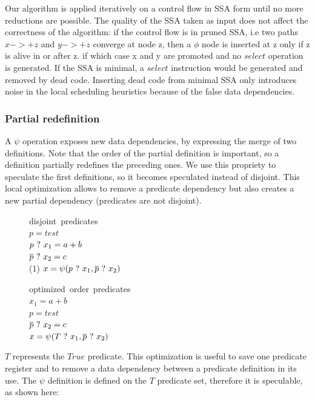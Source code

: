 Our algorithm is applied iteratively on a control flow in SSA form until no more reductions are possible. The quality of the SSA taken as input does not affect the correctness of the algorithm: if the control flow is in pruned SSA, i.e two paths $x->+z$ and $y->+z$ converge at node z, then a $\phi$ node is inserted at z only if z is alive in or after z. if which case x and y are promoted and no $select$ operation is generated. If the SSA is minimal, a $select$ instruction would be generated and removed by dead code. Inserting dead code from minimal SSA only introduces noise in the local scheduling heuristics because of the false data dependencies.

\subsubsection{Partial redefinition}

A $\psi$ operation exposes new data dependencies, by expressing the merge of two definitions. Note that the order of the partial definition is important, so a definition partially redefines the preceding ones. We use this propriety to speculate the first definitions, so it becomes speculated instead of disjoint. This local optimization allows to remove a predicate dependency but also creates a new partial dependency (predicates are not disjoint). 

\begin{figure}
\footnotesize
\begin{minipage}[t]{4cm}
\mbox{disjoint predicates} \\
$ p = test $ \\
$ p ~?~ x_1 = a + b $ \\
$ \overline{p} ~?~ x_2 = c $ \\
(1) $ x = \psi(p ~?~ x_1, \overline{p} ~?~ x_2) $ \\
\end{minipage}
\begin{minipage}[t]{4cm}
\mbox{optimized order predicates} \\
$ x_1 = a + b $ \\
$ p = test $ \\
$ \overline{p} ~?~ x_2 = c $ \\
$ x = \psi(T ~?~ x_1, \overline{p} ~?~ x_2) $ \\
\end{minipage}
\end{figure}

$T$ represents the $True$ predicate. This optimization is useful to save one predicate register and to remove a data dependency between a predicate definition in its use. 
The $\psi$ definition is defined on the $T$ predicate set, therefore it is speculable, as shown here:

